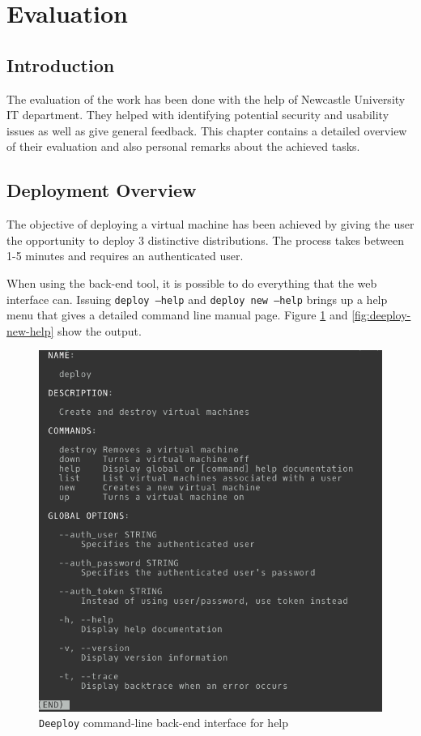 \documentclass{article}
\begin{document}
\newpage
\section{Evaluation}

\subsection{Introduction}
The evaluation of the work has been done with the help of Newcastle University \gls{IT} department. They helped with identifying potential security and usability issues as well as give general feedback. This chapter contains a detailed overview of their evaluation and also personal remarks about the achieved tasks.

\subsection{Deployment Overview}
The objective of deploying a virtual machine has been achieved by giving the user the opportunity to deploy 3 distinctive distributions. The process takes between 1-5 minutes and requires an authenticated user.

When using the back-end tool, it is possible to do everything that the web interface can. Issuing \texttt{deploy --help} and \texttt{deploy new --help} brings up a help menu that gives a detailed command line manual page. Figure \ref{fig:deeploy-help} and \ref{fig:deeploy-new-help} show the output.

\begin{figure}[h!]
	\vspace{0.5cm}
	\includegraphics[width=12cm]{deeploy_help_cli}
	\vspace{0.5cm}
	\caption{\texttt{Deeploy} command-line back-end interface for help}
	\label{fig:deeploy-help}
\end{figure}
\end{document}
